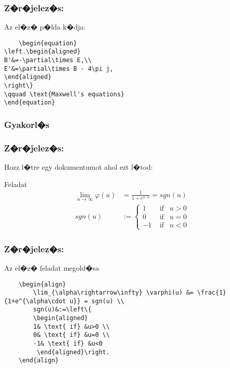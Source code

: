\documentclass[xcolor=pdftex,dvipsnames,table,compress,bigger]{beamer}
\begin{document}
\begin{frame}[fragile]
    \frametitle{Z�r�jelez�s:}
\begin{block}{Az el�z� p�lda k�dja:}
    \begin{verbatim}
    \begin{equation}
\left.\begin{aligned}
B'&=-\partial\times E,\\
E'&=\partial\times B - 4\pi j,
\end{aligned}
\right\}
\qquad \text{Maxwell's equations}
\end{equation}
\end{verbatim}
    \end{block}
\end{frame}

\subsubsection{Gyakorl�s}
\begin{frame}[fragile]
    \frametitle{Z�r�jelez�s:}
 Hozz l�tre egy dokumentumot ahol ezt l�tod:\\ 
    \begin{exampleblock}{Feladat}
    \begin{align}
    	\lim_{\alpha\rightarrow\infty} \varphi(u) &= \frac{1}{1+e^{\alpha\cdot u}} = sgn(u) \\
    	sgn(u)&:=\left\{
    	\begin{aligned}
    	1& \text{ if} &u>0 \\
    	0& \text{ if} &u=0 \\
    	-1& \text{ if} &u<0
    	 \end{aligned}\right.
    \end{align}
    \end{exampleblock}
\end{frame}

\begin{frame}[fragile]
    \frametitle{Z�r�jelez�s:}
    \begin{block}{Az el�z� feladat megold�sa}
    \begin{verbatim}
    \begin{align}
    	\lim_{\alpha\rightarrow\infty} \varphi(u) &= \frac{1}{1+e^{\alpha\cdot u}} = sgn(u) \\
    	sgn(u)&:=\left\{
    	\begin{aligned}
    	1& \text{ if} &u>0 \\
    	0& \text{ if} &u=0 \\
    	-1& \text{ if} &u<0
    	 \end{aligned}\right.
    \end{align}
    \end{verbatim}
    \end{block}
\end{frame}
\end{document}
